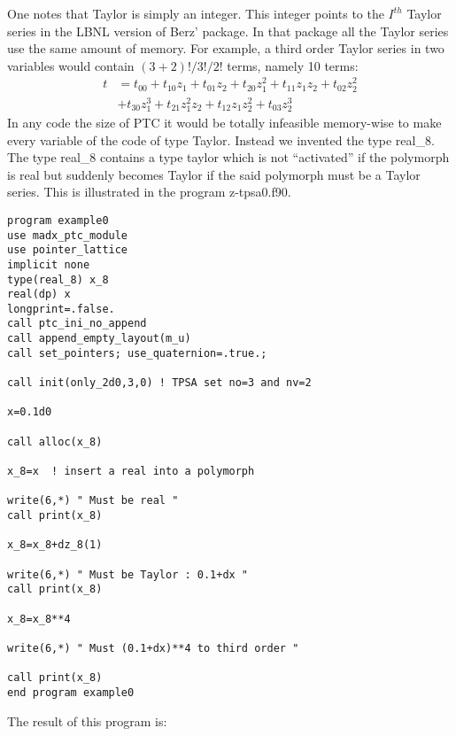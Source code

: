 \documentclass[english,12pt,article]{article} %
\begin{document}
One notes that Taylor is simply an integer. This integer points to the $I^{th}$ Taylor series in the LBNL version of Berz' package. In that package all the Taylor series use the same amount of memory. For example,  a third order Taylor series in two variables would contain $(3+2)!/3!/2!$ terms, namely 10 terms:
%
\begin{align} t&={t}_{00}+{t}_{10}{z}_{1}+{t}_{01}{z}_{2}+{t}_{20}{z}_{1}^{2}+{t}_{11}{z}_{1}{z}_{2}+{t}_{02}{z}_{2}^{2}\nonumber \\
 &+{t}_{30}{z}_{1}^{3}+{t}_{21}{z}_{1}^{2}{z}_{2}+{t}_{12}{z}_{1}{z}_{2}^{2}+{t}_{03}{z}_{2}^{3} \end{align}
%
In any code the size of PTC it would be totally infeasible memory-wise to make every variable of the code of type Taylor. Instead we invented the type real\_8. The type real\_8 contains a type taylor which is not ``activated'' if the polymorph is real but suddenly becomes Taylor if the said polymorph must be a Taylor series. This is illustrated in the program z-tpsa0.f90.  


{\footnotesize
\begin{verbatim}
program example0
use madx_ptc_module
use pointer_lattice
implicit none
type(real_8) x_8
real(dp) x
longprint=.false.
call ptc_ini_no_append
call append_empty_layout(m_u)
call set_pointers; use_quaternion=.true.;

call init(only_2d0,3,0) ! TPSA set no=3 and nv=2

x=0.1d0

call alloc(x_8)
 
x_8=x  ! insert a real into a polymorph
 
write(6,*) " Must be real "
call print(x_8)
 
x_8=x_8+dz_8(1)
 
write(6,*) " Must be Taylor : 0.1+dx "
call print(x_8)

x_8=x_8**4
 
write(6,*) " Must (0.1+dx)**4 to third order "
 
call print(x_8)
end program example0
\end{verbatim}
}


The result of this program is:
\end{document}
